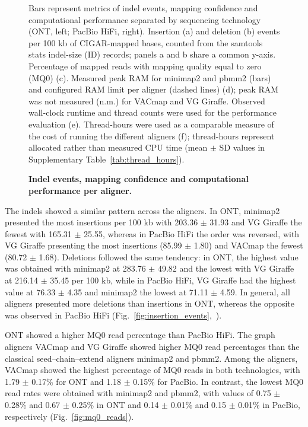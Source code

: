 \documentclass[12pt, letterpaper]{article}
\begin{document}
\begin{figure}[!tbp]
    \captionsetup{singlelinecheck=false}
    \caption{
        \textbf{Indel events, mapping confidence and computational performance per aligner.}}
    \label{fig:confidence_resources}
    \begin{minipage}{\linewidth}\footnotesize\noindent Bars represent metrics of indel events, mapping confidence and computational performance separated by sequencing technology (ONT, left; PacBio HiFi, right). Insertion (a) and deletion (b) events per 100 kb of CIGAR-mapped bases, counted from the samtools stats indel-size (ID) records; panels a and b share a common y-axis. Percentage of mapped reads with mapping quality equal to zero (MQ0) (c). Measured peak RAM for minimap2 and pbmm2 (bars) and configured RAM limit per aligner (dashed lines) (d); peak RAM was not measured (n.m.) for VACmap and VG Giraffe. Observed wall-clock runtime and thread counts were used for the performance evaluation (e). Thread-hours were used as a comparable measure of the cost of running the different aligners (f); thread-hours represent allocated rather than measured CPU time (mean $\pm$ SD values in Supplementary Table~\ref{tab:thread_hours}).
    \end{minipage}
\end{figure}

The indels showed a similar pattern across the aligners. In ONT, minimap2 presented the most insertions per 100 kb with 203.36 $\pm$ 31.93 and VG Giraffe the fewest with 165.31 $\pm$ 25.55, whereas in PacBio HiFi the order was reversed, with VG Giraffe presenting the most insertions (85.99 $\pm$ 1.80) and VACmap the fewest (80.72 $\pm$ 1.68). Deletions followed the same tendency: in ONT, the highest value was obtained with minimap2 at 283.76 $\pm$ 49.82 and the lowest with VG Giraffe at 216.14 $\pm$ 35.45 per 100 kb, while in PacBio HiFi, VG Giraffe had the highest value at 76.33 $\pm$ 4.35 and minimap2 the lowest at 71.11 $\pm$ 4.59. In general, all aligners presented more deletions than insertions in ONT, whereas the opposite was observed in PacBio HiFi (Fig.~\ref{fig:insertion_events},~).

ONT showed a higher MQ0 read percentage than PacBio HiFi. The graph aligners VACmap and VG Giraffe showed higher MQ0 read percentages than the classical seed--chain--extend aligners minimap2 and pbmm2. Among the aligners, VACmap showed the highest percentage of MQ0 reads in both technologies, with 1.79 $\pm$ 0.17\% for ONT and 1.18 $\pm$ 0.15\% for PacBio. In contrast, the lowest MQ0 read rates were obtained with minimap2 and pbmm2, with values of 0.75 $\pm$ 0.28\% and 0.67 $\pm$ 0.25\% in ONT and 0.14 $\pm$ 0.01\% and 0.15 $\pm$ 0.01\% in PacBio, respectively (Fig.~\ref{fig:mq0_reads}).
\end{document}
